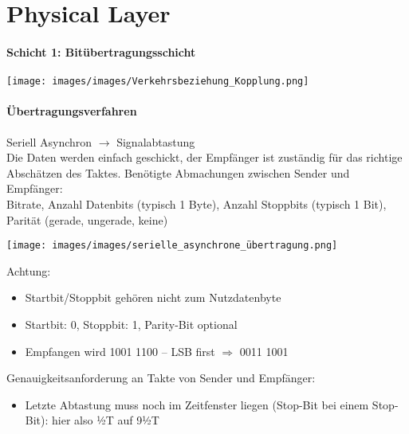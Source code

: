 \section{Physical Layer}
\paragraph{Schicht 1: Bitübertragungsschicht}
\texttt{[image: images/images/Verkehrsbeziehung\_Kopplung.png]}

\paragraph{Übertragungsverfahren}

\begin{definition}{Seriell Asynchron}  $\rightarrow$ Signalabtastung\\
    Die Daten werden einfach geschickt, der Empfänger ist zuständig für das richtige Abschätzen des Taktes.
    Benötigte Abmachungen zwischen Sender und Empfänger: \\
    Bitrate, Anzahl Datenbits (typisch 1 Byte), Anzahl Stoppbits (typisch 1 Bit), Parität (gerade, ungerade, keine)

    \texttt{[image: images/images/serielle\_asynchrone\_übertragung.png]}

    Achtung:
    \begin{itemize}
        \item Startbit/Stoppbit gehören nicht zum Nutzdatenbyte
        \item Startbit: 0, Stoppbit: 1, Parity-Bit optional
        \item Empfangen wird 1001 1100 – LSB first $\Rightarrow$ 0011 1001
    \end{itemize}

    Genauigkeitsanforderung an Takte von Sender und Empfänger:
    \begin{itemize}
        \item Letzte Abtastung muss noch im Zeitfenster liegen (Stop-Bit bei einem Stop-Bit): hier also ½T auf 9½T
    \end{itemize}

    
\end{definition}

